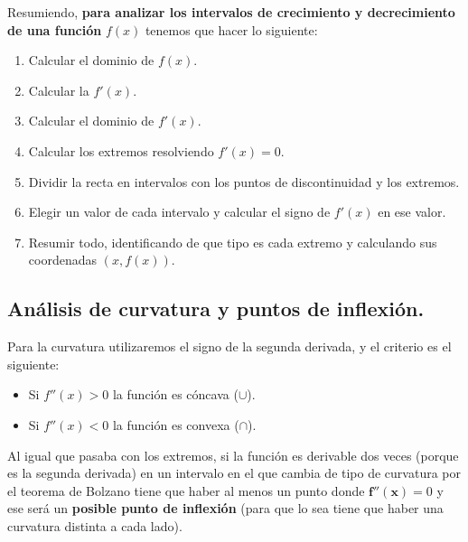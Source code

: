 \documentclass[a4paper,11pt,answers]{exam}
\begin{document}
Resumiendo, \textbf{para analizar los intervalos de crecimiento y decrecimiento de una función} $f(x)$ tenemos que hacer lo siguiente:
\begin{enumerate}
	\item Calcular el dominio de $f(x)$.
	\item Calcular la $f'(x)$.
	\item Calcular el dominio de $f'(x)$.
	\item Calcular los extremos resolviendo $f'(x) = 0$.
	\item Dividir la recta en intervalos con los puntos de discontinuidad y los extremos.
	\item Elegir un valor de cada intervalo y calcular el signo de $f'(x)$ en ese valor.
	\item Resumir todo, identificando de que tipo es cada extremo y calculando sus coordenadas $(x, f(x))$.
\end{enumerate}

\subsection{Análisis de curvatura y puntos de inflexión.} \label{curvatura}
Para la curvatura utilizaremos el signo de la segunda derivada, y el criterio es el siguiente:
\begin{itemize}
	\item Si $f''(x) > 0$ la función es cóncava ($\cup$).
	\item Si $f''(x) < 0$ la función es convexa ($\cap$).
\end{itemize}

Al igual que pasaba con los extremos, si la función es derivable dos veces (porque es la segunda derivada) en un intervalo en el que cambia de tipo de curvatura por el teorema de Bolzano tiene que haber al menos un punto donde $\boldsymbol{f''(x)} = 0$ y ese será un \textbf{posible punto de inflexión} (para que lo sea tiene que haber una curvatura distinta a cada lado).
\end{document}
